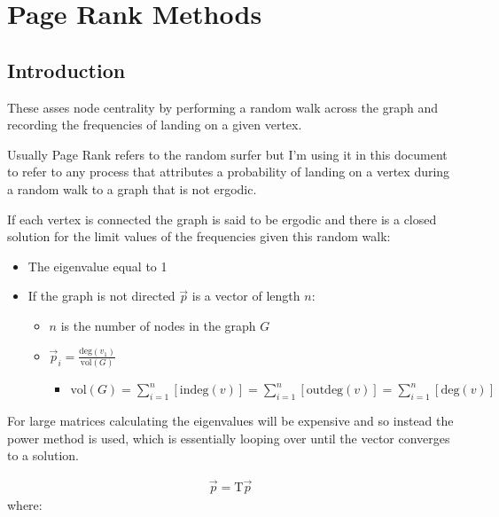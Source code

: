 \documentclass[11pt]{article}
\begin{document}
\section{Page Rank Methods}
\label{sec:org380d8db}
\subsection{Introduction}
\label{sec:orgec99811}
These asses node centrality by performing a random walk across the graph and recording the frequencies of landing on a given vertex.

Usually Page Rank refers to the random surfer but I'm using it in this document to refer to any process that attributes a probability of landing on a vertex during a random walk to a graph that is not ergodic.

If each vertex is connected the graph is said to be ergodic and there is a closed solution for the limit values of the frequencies given this random walk:

\begin{itemize}
\item The eigenvalue equal to 1
\item If the graph is not directed \(\vec{p}\) is a vector of length \(n\):
\begin{itemize}
\item \(n\) is the number of nodes in the graph \(G\)
\item \(\vec{p}_{i} = \frac{\mathrm{deg}(v_{1})}{\mathrm{vol}(G)}\)
\begin{itemize}
\item \(\mathrm{vol}(G) = \sum^{n}_{i = 1} \left[ \mathrm{indeg}(v) \right] = \sum^{n}_{i = 1} \left[ \mathrm{outdeg}(v) \right ] = \sum^{n}_{i = 1} \left[ \mathrm{deg}(v) \right]\)
\end{itemize}
\end{itemize}
\end{itemize}


For large matrices calculating the eigenvalues will be expensive and so instead the power method is used, which is essentially looping over until the vector converges to a solution.

\begin{align}
\vec{p} = \mathrm{T}\vec{p} \label{eq:pageRank-Method}
\end{align}
where:
\end{document}
